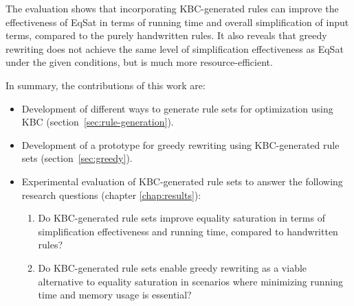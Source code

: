 The evaluation shows that incorporating KBC-generated rules can improve the effectiveness of EqSat in terms of running time and overall simplification of input terms, compared to the purely handwritten rules. It also reveals that greedy rewriting does not achieve the same level of simplification effectiveness as EqSat under the given conditions, but is much more resource-efficient.

In summary, the contributions of this work are:
\begin{itemize}
	\item Development of different ways to generate rule sets for optimization using KBC (section~\ref{sec:rule-generation}).
	\item Development of a prototype for greedy rewriting using KBC-generated rule sets (section~\ref{sec:greedy}).
	\item Experimental evaluation of KBC-generated rule sets to answer the following research questions (chapter \ref{chap:results}):
	\begin{enumerate}
		\item Do KBC-generated rule sets improve equality saturation in terms of simplification effectiveness and running time, compared to handwritten rules?
		\item Do KBC-generated rule sets enable greedy rewriting as a viable alternative to equality saturation in scenarios where minimizing running time and memory usage is essential?
	\end{enumerate}
\end{itemize}